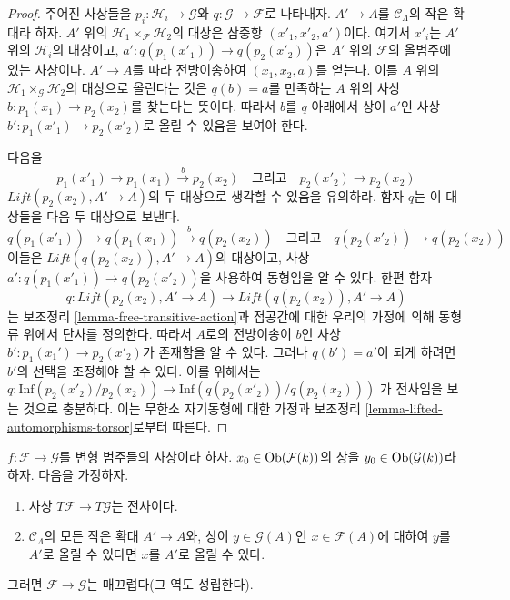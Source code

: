 \begin{proof}
주어진 사상들을 $p_i : \mathcal{H}_i \to \mathcal{G}$와
$q : \mathcal{G} \to \mathcal{F}$로 나타내자.
$A' \to A$를 $\mathcal{C}_\Lambda$의 작은 확대라 하자.
$A'$ 위의 $\mathcal{H}_1 \times_\mathcal{F} \mathcal{H}_2$의 대상은
삼중항 $(x'_1, x'_2, a')$이다. 여기서 $x'_i$는 $A'$ 위의
$\mathcal{H}_i$의 대상이고,
$a' : q(p_1(x'_1)) \to q(p_2(x'_2))$은 $A'$ 위의 $\mathcal{F}$의
올범주에 있는 사상이다. $A' \to A$를 따라 전방이송하여
$(x_1, x_2, a)$를 얻는다. 이를 $A$ 위의
$\mathcal{H}_1 \times_\mathcal{G} \mathcal{H}_2$의 대상으로 올린다는 것은
$q(b) = a$를 만족하는 $A$ 위의 사상
$b : p_1(x_1) \to p_2(x_2)$를 찾는다는 뜻이다. 따라서 $b$를
$q$ 아래에서 상이 $a'$인 사상
$b' : p_1(x'_1) \to p_2(x'_2)$로 올릴 수 있음을 보여야 한다.

\medskip\noindent
다음을
$$
p_1(x'_1) \to p_1(x_1) \xrightarrow{b} p_2(x_2)
\quad\text{그리고}\quad
p_2(x'_2) \to p_2(x_2)
$$
$\textit{Lift}(p_2(x_2), A' \to A)$의 두 대상으로 생각할 수 있음을
유의하라. 함자 $q$는 이 대상들을 다음 두 대상으로 보낸다.
$$
q(p_1(x'_1)) \to q(p_1(x_1)) \xrightarrow{b} q(p_2(x_2))
\quad\text{그리고}\quad
q(p_2(x'_2)) \to q(p_2(x_2))
$$
이들은 $\textit{Lift}(q(p_2(x_2)), A' \to A)$의 대상이고, 사상
$a' : q(p_1(x'_1)) \to q(p_2(x'_2))$을 사용하여 동형임을 알 수 있다.
한편 함자
$$
q : \textit{Lift}(p_2(x_2), A' \to A) \to
\textit{Lift}(q(p_2(x_2)), A' \to A)
$$
는 보조정리 \ref{lemma-free-transitive-action}과 접공간에 대한 우리의
가정에 의해 동형류 위에서 단사를 정의한다. 따라서 $A$로의 전방이송이
$b$인 사상 $b' : p_1(x_1') \to p_2(x'_2)$가 존재함을 알 수 있다.
그러나 $q(b') = a'$이 되게 하려면 $b'$의 선택을 조정해야 할 수 있다.
이를 위해서는
$q : \text{Inf}(p_2(x'_2)/p_2(x_2)) \to \text{Inf}(q(p_2(x'_2))/q(p_2(x_2)))$
가 전사임을 보는 것으로 충분하다. 이는 무한소 자기동형에 대한 가정과
보조정리 \ref{lemma-lifted-automorphisms-torsor}로부터 따른다.
\end{proof}

\begin{lemma}
\label{lemma-easy-check-smooth}
$f : \mathcal{F} \to \mathcal{G}$를 변형 범주들의 사상이라 하자.
$x_0 \in \mathop{\mathrm{Ob}}\nolimits(\mathcal{F}(k))$의 상을
$y_0 \in \mathop{\mathrm{Ob}}\nolimits(\mathcal{G}(k))$라 하자. 다음을 가정하자.
\begin{enumerate}
\item 사상 $T\mathcal{F} \to T\mathcal{G}$는 전사이다.
\item $\mathcal{C}_\Lambda$의 모든 작은 확대 $A' \to A$와, 상이
$y \in \mathcal{G}(A)$인 $x \in \mathcal{F}(A)$에 대하여
$y$를 $A'$로 올릴 수 있다면 $x$를 $A'$로 올릴 수 있다.
\end{enumerate}
그러면 $\mathcal{F} \to \mathcal{G}$는 매끄럽다(그 역도 성립한다).
\end{lemma}

